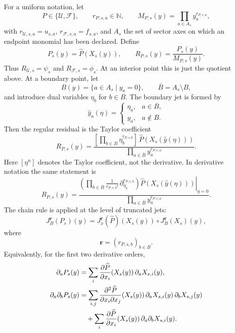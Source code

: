 \documentclass[11pt]{article}
\newcommand{\U}{\mathcal U}
\newcommand{\F}{\mathcal F}
\begin{document}
For a uniform notation, let
\begin{equation}
  P\in\{\U,\F\},
  \qquad
  r_{P,s,a}\in\mathbb N,
  \qquad
  M_{P,s}(y)=\prod_{a\in A_s}y_a^{r_{P,s,a}},
\end{equation}
with \(r_{\U,s,a}=u_{s,a}\), \(r_{\F,s,a}=f_{s,a}\), and \(A_s\) the set of
sector axes on which an endpoint monomial has been declared.  Define
\begin{equation}
  P_s(y)=\widehat P(X_s(y)),
  \qquad
  R_{P,s}(y)=\frac{P_s(y)}{M_{P,s}(y)}.
\end{equation}
Thus \(R_{\U,s}=\psi_s\) and \(R_{\F,s}=\phi_s\).  At an interior point this is
just the quotient above.  At a boundary point, let
\begin{equation}
  B(y)=\{a\in A_s\;|\;y_a=0\},
  \qquad
  \bar B=A_s\setminus B,
\end{equation}
and introduce dual variables \(\eta_b\) for \(b\in B\).  The boundary jet is
formed by
\begin{equation}
  \widehat y_a(\eta)=
  \begin{cases}
    \eta_a, & a\in B,\\
    y_a, & a\notin B .
  \end{cases}
\end{equation}
Then the regular residual is the Taylor coefficient
\begin{equation}
  R_{P,s}(y)
  =
  \frac{
    \left[
      \prod_{b\in B}\eta_b^{r_{P,s,b}}
    \right]\,
    \widehat P\!\left(X_s(\widehat y(\eta))\right)
  }{
    \prod_{a\in \bar B}y_a^{r_{P,s,a}}
  }.
\end{equation}
Here \([\eta^n]\) denotes the Taylor coefficient, not the derivative.  In
derivative notation the same statement is
\begin{equation}
  R_{P,s}(y)
  =
  \frac{
    \left.
    \left(\prod_{b\in B}
      \frac{1}{r_{P,s,b}!}\,
      \partial_{\eta_b}^{r_{P,s,b}}
    \right)
    \widehat P\!\left(X_s(\widehat y(\eta))\right)
    \right|_{\eta=0}
  }{
    \prod_{a\in\bar B}y_a^{r_{P,s,a}}
  }.
\end{equation}
The chain rule is applied at the level of truncated jets:
\begin{equation}
  J^{\mathbf r}_{B}\!\left(P_s\right)(y)
  =
  J^{\mathbf r}_{x}\!\left(\widehat P\right)\!\left(X_s(y)\right)
  \circ
  J^{\mathbf r}_{B}\!\left(X_s\right)(y),
\end{equation}
where
\begin{equation}
  \mathbf r=(r_{P,s,b})_{b\in B}.
\end{equation}
Equivalently, for the first two derivative orders,
\begin{align}
  \partial_a P_s(y)
  &=
  \sum_i
  \frac{\partial \widehat P}{\partial x_i}(X_s(y))\,
  \partial_a X_{s,i}(y),
  \\
  \partial_a\partial_b P_s(y)
  &=
  \sum_{i,j}
  \frac{\partial^2 \widehat P}{\partial x_i\partial x_j}(X_s(y))\,
  \partial_a X_{s,i}(y)\,
  \partial_b X_{s,j}(y)
  \notag\\
  &\quad+
  \sum_i
  \frac{\partial \widehat P}{\partial x_i}(X_s(y))\,
  \partial_a\partial_b X_{s,i}(y).
\end{align}
\end{document}
